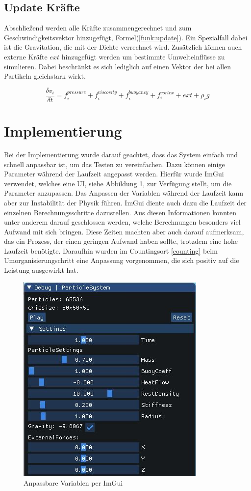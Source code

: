 \documentclass[intern,palatino]{cgBA}
\begin{document}

\subsection{Update Kräfte}\label{kräfte}

Abschließend werden alle Kräfte zusammengerechnet und zum Geschwindigkeitsvektor hinzugefügt, Formel(\ref{funk:update}). Ein Spezialfall dabei ist die Gravitation, die mit der Dichte verrechnet wird. Zusätzlich können auch externe Kräfte $ext$ hinzugefügt werden um bestimmte Umwelteinflüsse zu simulieren. Dabei beschränkt es sich lediglich auf einen Vektor der bei allen Partikeln gleichstark wirkt.
\newline

\begin{equation}\label{funk:update}
\frac{\delta v_i}{\delta t}  = f^{pressure}_i + f^{viscosity}_i + f^{buoyancy}_i + f^{vortex}_i + ext + \rho_i g
\end{equation}


\section{Implementierung}\label{imp}

Bei der Implementierung wurde darauf geachtet, dass das System einfach und schnell anpassbar ist, um das Testen zu vereinfachen.
Dazu können einige Parameter während der Laufzeit angepasst werden. Hierfür wurde ImGui \cite{ocornut} verwendet, welches eine UI, siehe Abbildung \ref{img:ext}, zur Verfügung stellt, um die Parameter anzupassen.
Das Anpassen der Variablen während der Laufzeit kann aber zur Instabilität der Physik führen.
\newline
ImGui diente auch dazu die Laufzeit der einzelnen Berechnungsschritte dazustellen. Aus diesen Informationen konnten unter anderem darauf geschlossen werden, welche Berechnungen besonders viel Aufwand mit sich bringen. Diese Zeiten machten aber auch darauf aufmerksam, das ein Prozess, der einen geringen Aufwand haben sollte, trotzdem eine hohe Laufzeit benötigte. Daraufhin wurden im Countingsort \ref{counting} beim Umorganisierungschritt eine Anpassung vorgenommen, die sich positiv auf die Leistung ausgewirkt hat.

\begin{figure}[H]
	\centering
	\includegraphics[width=0.35\columnwidth]{Bilder/external.jpg}
	\caption{Anpassbare Variablen per ImGui}
	\label{img:ext}
\end{figure}
\end{document}

